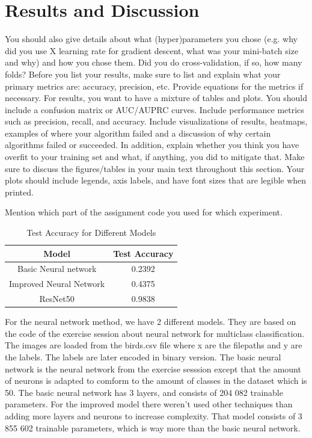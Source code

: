 \section{Results and Discussion}
You should also give details about what (hyper)parameters you chose (e.g. why did you use X learning rate for gradient descent, what was your mini-batch size and why) and how you chose them. Did you do cross-validation, if so, how many folds? Before you list your results, make sure to list and explain what your primary metrics are: accuracy, precision, etc. Provide equations for the metrics if necessary. For results, you want to have a mixture of tables and plots. You should include a confusion matrix or AUC/AUPRC curves. Include performance metrics such as precision, recall, and accuracy. Include visualizations of results, heatmaps, examples of where your algorithm failed and a discussion of why certain algorithms failed or succeeded. In addition, explain whether you think you have overfit to your training set and what, if anything, you did to mitigate that. Make sure to discuss the figures/tables in your main text throughout this section. Your plots should include legends, axis labels, and have font sizes that are legible when printed.

Mention which part of the assignment code you used for which experiment. 

\begin{table}[h]
  \centering
  \begin{tabular}{|c|c|}
    \hline
    \textbf{Model} & \textbf{Test Accuracy} \\
    \hline
    Basic Neural network & 0.2392\\
    Improved Neural Network & 0.4375 \\
    ResNet50 & 0.9838 \\
    \hline
  \end{tabular}
  \caption{Test Accuracy for Different Models}
  \label{tab:test_accuracy}
\end{table}

For the neural network method, we have 2 different models. They are based on the code of the exercise session about neural network for multiclass classification. The images are loaded from the birds.csv file where x are the filepaths and y are the labels. The labels are later encoded in binary version. The basic neural network is the neural network from the exercise sesssion except that the amount of neurons is adapted to comform to the amount of classes in the dataset which is 50. The basic neural network has 3 layers, and consists of 204 082 trainable parameters. For the improved model there weren't used other techniques than adding more layers and neurons to increase complexity. That model consists of 3 855 602 trainable parameters, which is way more than the basic neural network. 

